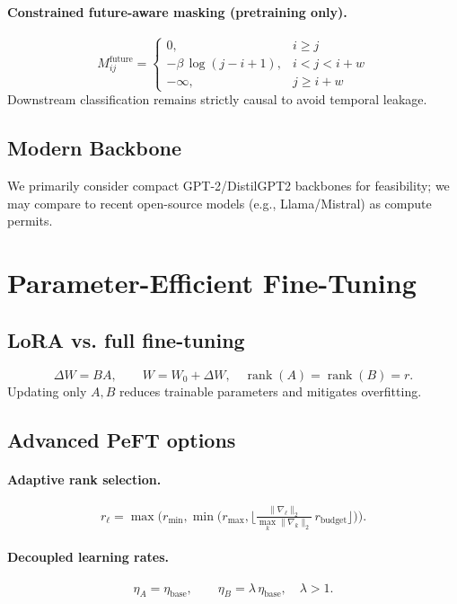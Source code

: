 \documentclass[letterpaper]{article}
\begin{document}
\paragraph{Constrained future-aware masking (pretraining only).}
\begin{equation}
M^{\mathrm{future}}_{ij} = \begin{cases}
0, & i \ge j \\
-\beta\, \log (j-i+1), & i<j<i+w \\
-\infty, & j \ge i+w
\end{cases}
\end{equation}
Downstream classification remains strictly causal to avoid temporal leakage.

\subsection{Modern Backbone}
We primarily consider compact GPT-2/DistilGPT2 backbones for feasibility; we may compare to recent open-source models (e.g., Llama/Mistral) as compute permits.

\section{Parameter-Efficient Fine-Tuning}
\subsection{LoRA vs. full fine-tuning}
\begin{equation}
\Delta W = BA, \qquad W = W_0 + \Delta W, \quad \operatorname{rank}(A)=\operatorname{rank}(B)=r.
\end{equation}
Updating only $A,B$ reduces trainable parameters and mitigates overfitting.

\subsection{Advanced PeFT options}
\paragraph{Adaptive rank selection.}
\begin{equation}
r_\ell = \max\!\Big( r_{\min}, \min\!\big( r_{\max}, \big\lfloor \tfrac{\lVert \nabla_\ell \rVert_2}{\max_k \lVert \nabla_k \rVert_2} \, r_{\mathrm{budget}} \big\rfloor \big) \Big).
\end{equation}
\paragraph{Decoupled learning rates.}
\begin{equation}
\eta_A = \eta_{\mathrm{base}}, \qquad \eta_B = \lambda \, \eta_{\mathrm{base}}, \quad \lambda>1.
\end{equation}
\end{document}
